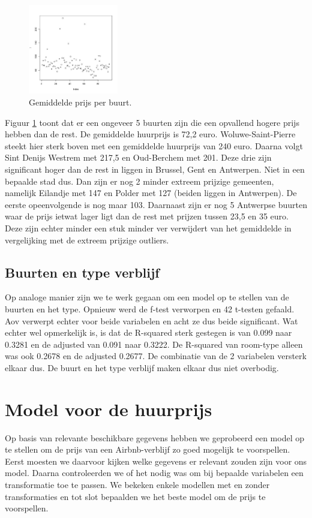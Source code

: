 \documentclass[a4paper,kulak]{kulakarticle} %
\begin{document}
\begin{figure}
	\begin{center}
		\includegraphics[width=0.35\textwidth]{pn.jpg}
	\end{center}
	\caption{Gemiddelde prijs per buurt.}
	\label{fig:pn}
\end{figure}
Figuur \ref{fig:pn} toont dat er een ongeveer 5 buurten zijn die een opvallend hogere prijs hebben dan de rest.
De gemiddelde huurprijs is 72,2 euro.
Woluwe-Saint-Pierre steekt hier sterk boven met een gemiddelde huurprijs van 240 euro.
Daarna volgt Sint Denijs Westrem met 217,5 en Oud-Berchem met 201.
Deze drie zijn significant hoger dan de rest in liggen in Brussel, Gent en Antwerpen. Niet in een bepaalde stad dus.
Dan zijn er nog 2 minder extreem prijzige gemeenten, namelijk Eilandje met 147 en Polder met 127 (beiden liggen in Antwerpen). De eerste opeenvolgende is nog maar 103.
Daarnaast zijn er nog 5 Antwerpse buurten waar de prijs ietwat lager ligt dan de rest met prijzen tussen 23,5 en 35 euro.
Deze zijn echter minder een stuk minder ver verwijdert van het gemiddelde in vergelijking met de extreem prijzige outliers.

\subsection{Buurten en type verblijf}
Op analoge manier zijn we te werk gegaan om een model op te stellen van de buurten en het type.
Opnieuw werd de f-test verworpen en 42 t-testen gefaald.
Aov verwerpt echter voor beide variabelen en acht ze dus beide significant.
Wat echter wel opmerkelijk is, is dat de R-squared sterk gestegen is van 0.099 naar 0.3281 en de adjusted van 0.091 naar 0.3222.
De R-squared van room-type alleen was ook 0.2678 en de adjusted 0.2677. De combinatie van de 2 variabelen versterk elkaar dus.
De buurt en het type verblijf maken elkaar dus niet overbodig.




\section{Model voor de huurprijs}
Op basis van relevante beschikbare gegevens hebben we geprobeerd een model op te stellen om de prijs van een Airbnb-verblijf zo goed mogelijk te voorspellen. Eerst moesten we daarvoor kijken welke gegevens er relevant zouden zijn voor ons model. Daarna controleerden we of het nodig was om bij bepaalde variabelen een transformatie toe te passen. We bekeken enkele modellen met en zonder transformaties en tot slot bepaalden we het beste model om de prijs te voorspellen.
\end{document}
